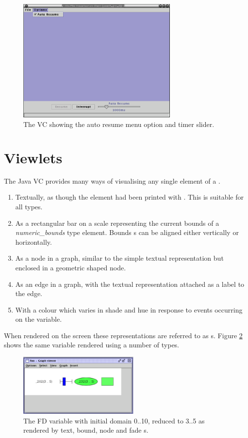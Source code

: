 \begin{figure}[htsp]
\centering
\includegraphics[width=8cm]{vcautoresume}
\caption{The VC showing the auto resume menu option and timer slider.}
\label{fig:autoresume}
\end{figure}


\section{Viewlets}

The Java VC provides many ways of visualising any single element of a
\viewable{}.

\begin{enumerate}
\item Textually, as though the element had been printed with
.  This is
suitable for all \viewable{} types.
\item As a rectangular bar on a scale representing the current bounds
of a \emph{numeric_bounds} type \viewable{} element.  Bounds
\viewlet{}s can be aligned either vertically or horizontally.
\item As a node in a graph, similar to the simple textual
representation but enclosed in a geometric shaped node.
\item As an edge in a graph, with the textual representation attached
as a label to the edge.
\item With a colour which varies in shade and hue in response to
events occurring on the variable.
\end{enumerate}

When rendered on the screen these representations are referred to as
\viewlet{}s.  Figure \ref{fig:viewlets} shows the same variable
rendered using a number of \viewlet{} types.

\begin{figure}[htsp]
\centering
\includegraphics[width=6cm]{vcviewlets}
\caption{The FD variable with initial domain 0..10, reduced to 3..5 as
rendered by text, bound, node and fade \viewlet{}s.}
\label{fig:viewlets}
\end{figure}


